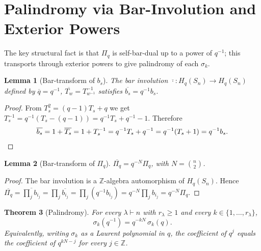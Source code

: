 \documentclass[11pt]{article}
\newtheorem{theorem}{Theorem}
\newtheorem{lemma}[theorem]{Lemma}
\theoremstyle{definition}
\newcommand{\Pq}{\Pi_q}
\newcommand{\Hq}{H_q(S_n)}
\newcommand{\Z}{\mathbb{Z}}
\newcommand{\bl}[1]{\overline{#1}}
\begin{document}
\section{Palindromy via Bar-Involution and Exterior Powers}

The key structural fact is that $\Pq$ is self-bar-dual up to a power of
$q^{-1}$; this transports through exterior powers to give palindromy of
each $\sigma_k$.

\begin{lemma}[Bar-transform of $b_s$]\label{lem:bs-bar}
The bar involution $\bl{\cdot}:\Hq\to\Hq$ defined by
$\bl{q}=q^{-1}$, $\bl{T_w}=T_{w^{-1}}^{-1}$ satisfies
$\bl{b_s}=q^{-1}b_s$.
\end{lemma}
\begin{proof}
From $T_s^2=(q-1)T_s+q$ we get $T_s^{-1}=q^{-1}(T_s-(q-1))=q^{-1}T_s+
q^{-1}-1$. Therefore
\[
  \bl{b_s}=1+\bl{T_s}=1+T_s^{-1}=q^{-1}T_s+q^{-1}=q^{-1}(T_s+1)=q^{-1}b_s.
\qedhere
\]
\end{proof}

\begin{lemma}[Bar-transform of $\Pq$]\label{lem:piq-bar}
$\bl{\Pq}=q^{-N}\Pq$, with $N=\binom{n}{2}$.
\end{lemma}
\begin{proof}
The bar involution is a $\Z$-algebra automorphism of $\Hq$. Hence
$\bl{\Pq}=\bl{\prod_j b_{i_j}}=\prod_j\bl{b_{i_j}}=\prod_j (q^{-1}
b_{i_j})=q^{-N}\prod_j b_{i_j}=q^{-N}\Pq$.
\end{proof}

\begin{theorem}[Palindromy]\label{thm:palindromy}
For every $\lambda\vdash n$ with $r_\lambda\ge 1$ and every
$k\in\{1,\ldots,r_\lambda\}$,
\begin{equation}\label{eq:palindromy}
  \sigma_k(q^{-1}) = q^{-kN}\,\sigma_k(q).
\end{equation}
Equivalently, writing $\sigma_k$ as a Laurent polynomial in $q$, the
coefficient of $q^j$ equals the coefficient of $q^{kN-j}$ for every
$j\in\Z$.
\end{theorem}
\end{document}
